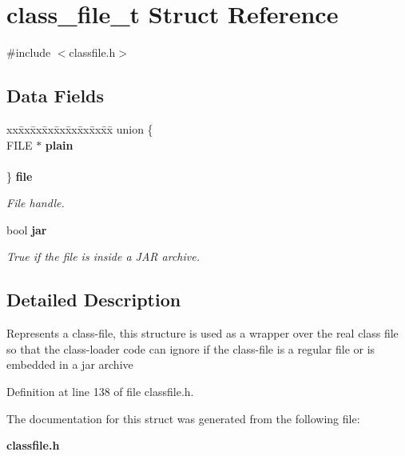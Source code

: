 \section{class\_\-file\_\-t Struct Reference}
\label{structclass__file__t}


{\ttfamily \#include $<$classfile.h$>$}

\subsection*{Data Fields}
\begin{DoxyCompactItemize}
\item 
\begin{tabbing}
xx\=xx\=xx\=xx\=xx\=xx\=xx\=xx\=xx\=\kill
union \{\\
\>FILE $\ast$ {\bf plain}\\
\>\\
\} {\bf file}\label{structclass__file__t_a7ca146163212adaaa17202cadf60d844}
\\

\end{tabbing}\begin{DoxyCompactList}\small\item\em File handle. \item\end{DoxyCompactList}\item 
bool {\bf jar}\label{structclass__file__t_ae3ff058bef385687f040167b3adf636d}

\begin{DoxyCompactList}\small\item\em True if the file is inside a JAR archive. \item\end{DoxyCompactList}\end{DoxyCompactItemize}


\subsection{Detailed Description}
Represents a class-\/file, this structure is used as a wrapper over the real class file so that the class-\/loader code can ignore if the class-\/file is a regular file or is embedded in a jar archive 

Definition at line 138 of file classfile.h.



The documentation for this struct was generated from the following file:\begin{DoxyCompactItemize}
\item 
{\bf classfile.h}\end{DoxyCompactItemize}
